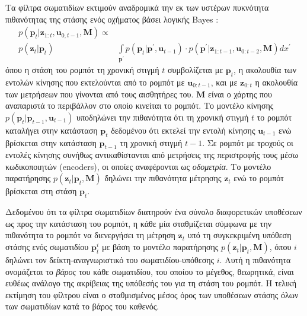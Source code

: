 Τα φίλτρα σωματιδίων εκτιμούν αναδρομικά την εκ των υστέρων πυκνότητα
πιθανότητας της στάσης ενός οχήματος βάσει λογικής Bayes
\cite{thrun2005probabilistic}:
\begin{align}
  \label{eq:pf_posterior}
  p(\bm{p}_t | \bm{z}_{1:t}, \bm{u}_{0,t-1}, \bm{M}) \propto & \nonumber \\
    p(\bm{z}_t | \bm{p}_t) &\int\limits_{\bm{p}^{\prime}} p(\bm{p}_t | \bm{p}^{\prime}, \bm{u}_{t-1}) \cdot p(\bm{p}^{\prime} | \bm{z}_{1:t-1}, \bm{u}_{0:t-2}, \bm{M}) dx^{\prime}
\end{align}
όπου η στάση του ρομπότ τη χρονική στιγμή $t$ συμβολίζεται με $\bm{p}_t$, η
ακολουθία των εντολών κίνησης που εκτελούνται από το ρομπότ με
$\bm{u}_{0:t-1}$, και με $\bm{z}_{0:t}$ η ακολουθία των μετρήσεων που γίνονται
από τους αισθητήρες του. $\bm{M}$ είναι ο χάρτης που αναπαριστά το περιβάλλον
στο οποίο κινείται το ρομπότ. Το μοντέλο κίνησης $p(\bm{p}_t | \bm{p}_{t-1},
\bm{u}_{t-1})$ υποδηλώνει την πιθανότητα ότι τη χρονική στιγμή $t$ το ρομπότ
καταλήγει στην κατάσταση $\bm{p}_t$ δεδομένου ότι εκτελεί την εντολή κίνησης
$\bm{u}_{t-1}$ ενώ βρίσκεται στην κατάσταση $\bm{p}_{t-1}$ τη χρονική στιγμή
$t-1$. Σε ρομπότ με τροχούς οι εντολές κίνησης συνήθως αντικαθίστανται από
μετρήσεις της περιστροφής τους μέσω κωδικοποιητών (encoders), οι οποίες
αναφέρονται ως \textit{οδομετρία}. Το μοντέλο παρατήρησης $p(\bm{z}_t |
\bm{p}_t, \bm{M})$ δηλώνει την πιθανότητα μέτρησης $\bm{z}_t$ ενώ το ρομπότ
βρίσκεται στη στάση $\bm{p}_t$.

Δεδομένου ότι τα φίλτρα σωματιδίων διατηρούν ένα σύνολο διαφορετικών υποθέσεων
ως προς την κατάσταση του ρομπότ, η κάθε μία σταθμίζεται σύμφωνα με την
πιθανότητα το ρομπότ να διενεργήσει τη μέτρηση $\bm{z}_t$ υπό τη συγκεκριμένη
υπόθεση στάσης ενός σωματιδίου $\bm{p}_t^i$ με βάση το μοντέλο παρατήρησης
$p(\bm{z}_t | \bm{p}_t, \bm{M})$, όπου $i$ δηλώνει τον δείκτη-αναγνωριστικό του
σωματιδίου-υπόθεσης $i$. Αυτή η πιθανότητα ονομάζεται το \textit{βάρος} του
κάθε σωματιδίου, του οποίου το μέγεθος, θεωρητικά, είναι ευθέως ανάλογο της
ακρίβειας της υπόθεσής του για τη στάση του ρομπότ. Η τελική εκτίμηση του
φίλτρου είναι ο σταθμισμένος μέσος όρος των υποθέσεων στάσης όλων των
σωματιδίων κατά το βάρος του καθενός.


